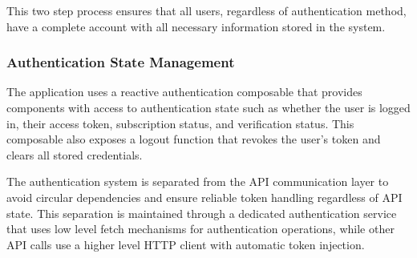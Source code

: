 This two step process ensures that all users, regardless of authentication method, have a complete account with all necessary information stored in the system.

\subsubsection{Authentication State Management}

The application uses a reactive authentication composable that provides components with access to authentication state such as whether the user is logged in, their access token, subscription status, and verification status. This composable also exposes a logout function that revokes the user's token and clears all stored credentials.

The authentication system is separated from the API communication layer to avoid circular dependencies and ensure reliable token handling regardless of API state. This separation is maintained through a dedicated authentication service that uses low level fetch mechanisms for authentication operations, while other API calls use a higher level HTTP client with automatic token injection.
